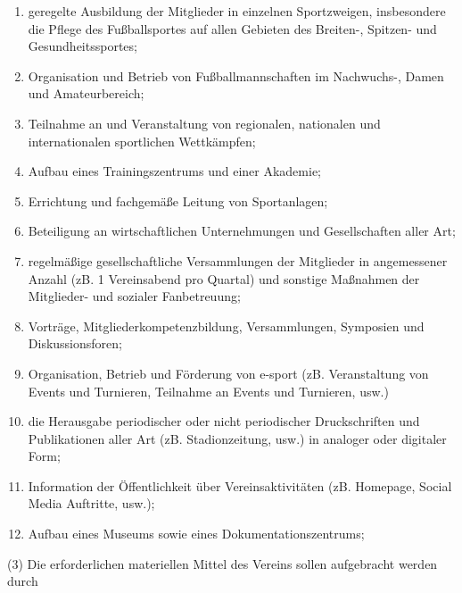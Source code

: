 \documentclass[11pt,a4paper]{article}
\begin{document}
\begin{enumerate}[label=\alph*)]
\item
geregelte Ausbildung der Mitglieder in einzelnen Sportzweigen, insbesondere die Pflege des Fußballsportes auf allen Gebieten des Breiten-, Spitzen- und Gesundheitssportes;
\item
Organisation und Betrieb von Fußballmannschaften im Nachwuchs-, Damen und Amateurbereich;
\item
Teilnahme an und Veranstaltung von regionalen, nationalen und internationalen sportlichen Wettkämpfen;
\item
Aufbau eines Trainingszentrums und einer Akademie;
\item
Errichtung und fachgemäße Leitung von Sportanlagen;
\item
Beteiligung an wirtschaftlichen Unternehmungen und Gesellschaften aller Art;
\item
regelmäßige gesellschaftliche Versammlungen der Mitglieder in angemessener Anzahl (zB. 1 Vereinsabend pro Quartal) und sonstige Maßnahmen der Mitglieder- und sozialer Fanbetreuung;
\item
Vorträge, Mitgliederkompetenzbildung, Versammlungen, Symposien und Diskussionsforen;
\item
Organisation, Betrieb und Förderung von e-sport (zB. Veranstaltung von Events und Turnieren, Teilnahme an Events und Turnieren, usw.)
\item
die Herausgabe periodischer oder nicht periodischer Druckschriften und Publikationen aller Art (zB. Stadionzeitung, usw.) in analoger oder digitaler Form;
\item
Information der Öffentlichkeit über Vereinsaktivitäten (zB. Homepage, Social Media Auftritte, usw.);
\item
Aufbau eines Museums sowie eines Dokumentationszentrums;
\end{enumerate}

(3)
Die erforderlichen materiellen Mittel des Vereins sollen aufgebracht werden durch
\end{document}
